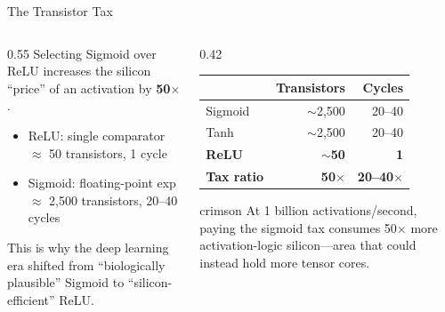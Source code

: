 \documentclass[aspectratio=169, 12pt]{beamer}
\begin{document}
\begin{frame}{The Transistor Tax}
\begin{columns}[T]
\begin{column}{0.55\textwidth}
    \vspace{0.08cm}
    Selecting Sigmoid over ReLU increases the silicon ``price'' of an
    activation by \textbf{50$\times$}.

    \vspace{0.1cm}
    \begin{itemize}\setlength\itemsep{1pt}
      \item ReLU: single comparator $\approx$ 50 transistors, 1 cycle
      \item Sigmoid: floating-point exp $\approx$ 2,500 transistors, 20--40 cycles
    \end{itemize}

    \vspace{0.08cm}

    \vspace{0.08cm}
    {\scriptsize This is why the deep learning era shifted from ``biologically
    plausible'' Sigmoid to ``silicon-efficient'' ReLU.}
  \end{column}
  \begin{column}{0.42\textwidth}
    \vspace{0.1cm}
    \renewcommand{\arraystretch}{1.1}
    {\scriptsize
    \begin{tabular}{@{}lrr@{}}
      \toprule
      & \textbf{Transistors} & \textbf{Cycles} \\
      \midrule
      Sigmoid & $\sim$2,500 & 20--40 \\
      Tanh    & $\sim$2,500 & 20--40 \\
      \textcolor{datastroke}{\textbf{ReLU}} & \textcolor{datastroke}{\textbf{$\sim$50}} & \textcolor{datastroke}{\textbf{1}} \\
      \midrule
      \textbf{Tax ratio} & \textbf{50$\times$} & \textbf{20--40$\times$} \\
      \bottomrule
    \end{tabular}
    }

    \vspace{0.15cm}
    \begin{mlsyscard}{crimson}
    {\scriptsize At 1 billion activations/second, paying the sigmoid tax consumes
    50$\times$ more activation-logic silicon---area that could instead hold
    more tensor cores.}
    \end{mlsyscard}
  \end{column}
\end{columns}

\end{frame}
\end{document}
